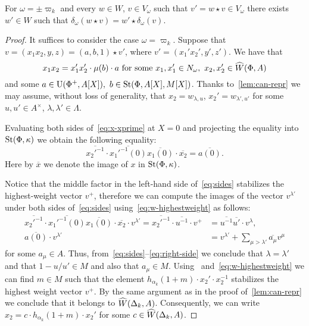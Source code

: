 \begin{prop} \label{prop:v-correctness2}
 For $\omega = \pm \varpi_k$ and every $w \in W$, $v \in V_\omega$ such that $v' = w \star v \in V_\omega$ there exists $w' \in W$ such that
  $\delta_\omega(w \star v) = w' \star \delta_\omega(v)$.
\end{prop}
\begin{proof}
 It suffices to consider the case $\omega = \varpi_k$.
 Suppose that $v = (x_1 x_2, y, z) = (a, b, 1) \star v'$, where $v' = (x_1' x_2', y', z')$.
 We have that
 \begin{equation}\label{eq:x-xprime} x_1 x_2 = x_1' x_2' \cdot \mu(b) \cdot a  \text{ for some }x_1, x_1' \in N_\omega,\ x_2, x_2' \in \widehat{W}(\Phi, A) \end{equation}
 and some $a \in \operatorname{U}(\Phi^+, A[X]),\ b \in \operatorname{St}(\Phi, A[X], M[X])$.
 Thanks to~\cref{lem:can-repr} we may assume, without loss of generality, that $x_2 = w_{\lambda, u}$, $x_2' = w_{\lambda', u'}$
 for some $u, u' \in A^\times$, $\lambda, \lambda' \in \Lambda$.

 Evaluating both sides of~\eqref{eq:x-xprime} at $X=0$ and projecting the equality into $\operatorname{St}(\Phi, \kappa)$ we obtain the following equality:
 \begin{equation} \label{eq:sides}
 \overline{{x_2'}^{-1}} \cdot \overline{{x_1'}^{-1}(0)} \overline{x_1(0)} \cdot \overline{x_2} = \overline{a(0)}.
 \end{equation}
 Here by $\overline{x}$ we denote the image of $x$ in $\operatorname{St}(\Phi, \kappa)$.

 Notice that the middle factor in the left-hand side of~\eqref{eq:sides} stabilizes the highest-weight vector $v^+$,
 therefore we can compute the images of the vector $v^{\lambda'}$ under both sides of~\eqref{eq:sides} using~\eqref{eq:w-highestweight} as follows:
 \begin{align} \overline{{x_2'}^{-1}} \cdot \overline{{x_1'}^{-1}(0)} \overline{x_1(0)} \cdot \overline{x_2} \cdot v^{\lambda'} = \overline{{x_2'}^{-1}} \cdot \overline{{u}^{-1}} \cdot v^+ &= \overline{u^{-1}}\overline{u'} \cdot v^\lambda, \\
               \overline{a(0)} \cdot v^{\lambda'} &= v^{\lambda'} + \sum_{\mu > \lambda'} \overline{a_\mu} v^\mu \label{eq:right-side} \end{align}
 for some $a_\mu \in A$.
 Thus, from~\eqref{eq:sides}--\eqref{eq:right-side} we conclude that $\lambda = \lambda'$ and that $1 - u/u' \in M$ and also that $a_\mu \in M$.
 Using~\cite[Lemma~7]{V00} and~\eqref{eq:w-highestweight} we can find $m \in M$ such that the element
  $h_{\alpha_k}(1+m) \cdot x_2' \cdot x_2^{-1}$ stabilizes the highest weight vector $v^+$.
 By the same argument as in the proof of~\cref{lem:can-repr} we conclude that it belongs to $\widehat{W}(\Delta_k, A)$.
 Consequently, we can write $x_2 = c \cdot h_{\alpha_k}(1+m) \cdot x_2'$ for some $c \in \widehat{W}(\Delta_k, A)$.


\end{proof}
